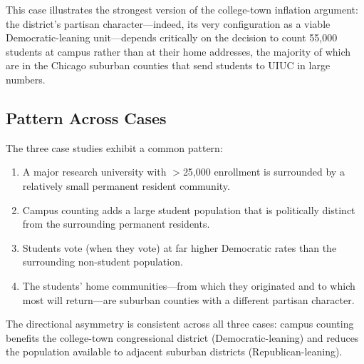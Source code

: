 This case illustrates the strongest version of the college-town inflation argument: the district's partisan character---indeed, its very configuration as a viable Democratic-leaning unit---depends critically on the decision to count 55,000 students at campus rather than at their home addresses, the majority of which are in the Chicago suburban counties that send students to UIUC in large numbers.

\subsection{Pattern Across Cases}

The three case studies exhibit a common pattern:
\begin{enumerate}
    \item A major research university with $>$25,000 enrollment is surrounded by a relatively small permanent resident community.
    \item Campus counting adds a large student population that is politically distinct from the surrounding permanent residents.
    \item Students vote (when they vote) at far higher Democratic rates than the surrounding non-student population.
    \item The students' home communities---from which they originated and to which most will return---are suburban counties with a different partisan character.
\end{enumerate}

The directional asymmetry is consistent across all three cases: campus counting benefits the college-town congressional district (Democratic-leaning) and reduces the population available to adjacent suburban districts (Republican-leaning).
